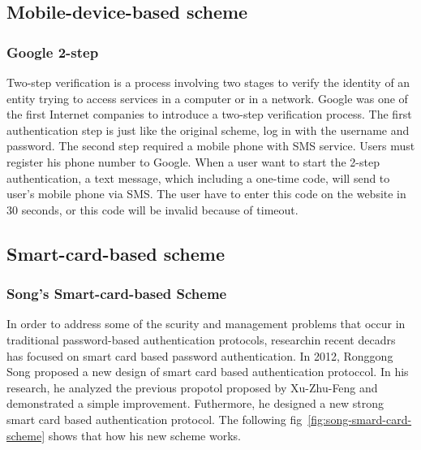 \begin{CJK}{Bg5}{bsmi}
\subsection{Mobile-device-based scheme}

\subsubsection{Google 2-step}

Two-step verification is a process involving two stages to verify the identity of an entity trying to access services in a computer or in a network. Google was one of the first Internet companies to introduce a two-step verification process. The first authentication step is just like the original scheme, log in with the username and password. The second step required a mobile phone with SMS service. Users must register his phone number to Google. When a user want to start the 2-step authentication, a text message, which including a one-time code, will send to user's mobile phone via SMS. The user have to enter this code on the website in 30 seconds, or this code will be invalid because of timeout.

\subsection{Smart-card-based scheme}

\subsubsection{Song's Smart-card-based Scheme}

In order to address some of the scurity and management problems that occur in traditional password-based authentication protocols, researchin recent decadrs has focused on smart card based password authentication. In 2012, Ronggong Song proposed a new design of smart card based authentication protoccol. In his research, he analyzed the previous propotol proposed by Xu-Zhu-Feng and demonstrated a simple improvement. Futhermore, he designed a new strong smart card based authentication protocol. The following fig~\ref{fig:song-smard-card-scheme} shows that how his new scheme works.


\end{CJK}
